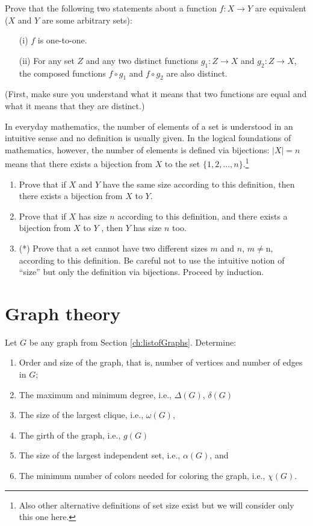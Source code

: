 \documentclass[11pt,paper=b5,footinclude,headinclude]{scrbook} %
\theoremstyle{remark}
\theoremstyle{definition} %
\theoremstyle{theorem} %
\newtheorem{ex}{Exercise\hypertarget{sol:\theex}}[chapter]
\begin{document}
\begin{ex}
Prove that the following two statements about a function \( f : X \to Y \) are equivalent (\( X \) and \( Y \) are some arbitrary sets):
\begin{enumerate}
    \item[(i)] \( f \) is one-to-one.
    \item[(ii)] For any set \( Z \) and any two distinct functions \( g_1 : Z \to X \) and \( g_2 : Z \to X \), the composed functions \( f \circ g_1 \) and \( f \circ g_2 \) are also distinct.
\end{enumerate}
(First, make sure you understand what it means that two functions are equal and what it means that they are distinct.)
\end{ex}

\begin{ex}
In everyday mathematics, the number of elements of a set is understood in an intuitive sense and no definition is usually given. In the logical foundations of mathematics, however, the number of elements 
is defined via bijections: 
$|X| = n$ means that there exists a bijection
from $X$ to the set $\{1, 2, . . . , n\}$.\footnote{Also other alternative definitions of
set size exist but we will consider only this one here.}
\begin{enumerate}
    \item Prove that if $X$ and $Y$ have the same size according to this definition,
then there exists a bijection from $X$ to $Y$.
\item Prove that if $X$ has size $n$ according to this definition, and there
exists a bijection from $X$ to $Y$ , then $Y$ has size $n$ too.
\item (*) Prove that a set cannot have two different sizes $m$ and $n$, $m \neq $n,
according to this definition. Be careful not to use the intuitive notion
of “size” but only the definition via bijections. Proceed by induction.
\end{enumerate}

\end{ex}


\section{Graph theory}
\begin{ex}
    Let $G$ be any graph from Section \ref{ch:listofGraphs}.
    Determine:
	\begin{enumerate}
	\item Order and size of the graph, that is, number of vertices and number of edges in $G$;
        \item The maximum and minimum degree, i.e., \( \Delta(G) \), \( \delta(G) \)
		\item The size of the largest clique, i.e., \( \omega(G) \),
		\item The girth of the graph, i.e., \( g(G) \)
		\item The size of the largest independent set, i.e., \( \alpha(G) \), and
		\item The minimum number of colors needed for coloring the graph, i.e., \( \chi(G) \).
	\end{enumerate}
\end{ex}
\end{document}
